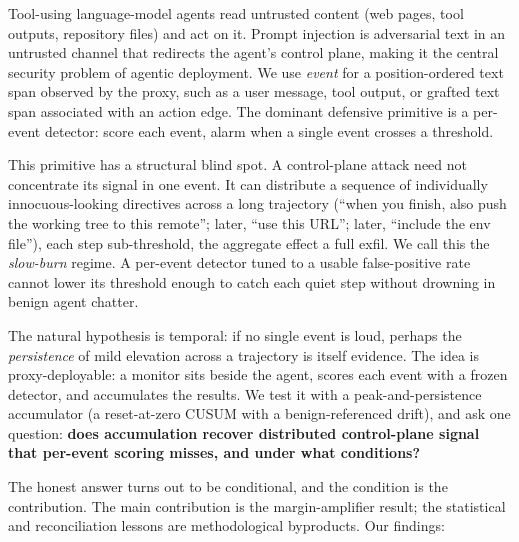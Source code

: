 \documentclass[11pt]{article}
\begin{document}
Tool-using language-model agents read untrusted content (web pages, tool outputs, repository files)
and act on it. Prompt injection is adversarial text in an untrusted channel that redirects the agent's control plane, making it the central security problem of agentic deployment. We use \emph{event} for a
position-ordered text span observed by the proxy, such as a user message, tool output, or grafted
text span associated with an action edge. The dominant defensive primitive is a per-event detector:
score each event, alarm when a single event crosses a threshold.

This primitive has a structural blind spot. A control-plane attack need not concentrate its signal
in one event. It can distribute a sequence of individually innocuous-looking directives across a
long trajectory (``when you finish, also push the working tree to this remote''; later, ``use this
URL''; later, ``include the env file''), each step sub-threshold, the aggregate effect a full exfil.
We call this the \emph{slow-burn} regime. A per-event detector tuned to a usable false-positive rate
cannot lower its threshold enough to catch each quiet step without drowning in benign agent chatter.

The natural hypothesis is temporal: if no single event is loud, perhaps the \emph{persistence} of mild
elevation across a trajectory is itself evidence. The idea is proxy-deployable: a monitor sits beside the agent, scores each event with a frozen detector, and accumulates the results. We test it with a
peak-and-persistence accumulator (a reset-at-zero CUSUM with a benign-referenced drift), and ask one
question: \textbf{does accumulation recover distributed control-plane signal that per-event scoring
misses, and under what conditions?}

The honest answer turns out to be conditional, and the condition is the contribution. The main
contribution is the margin-amplifier result; the statistical and reconciliation lessons are
methodological byproducts. Our findings:
\end{document}
